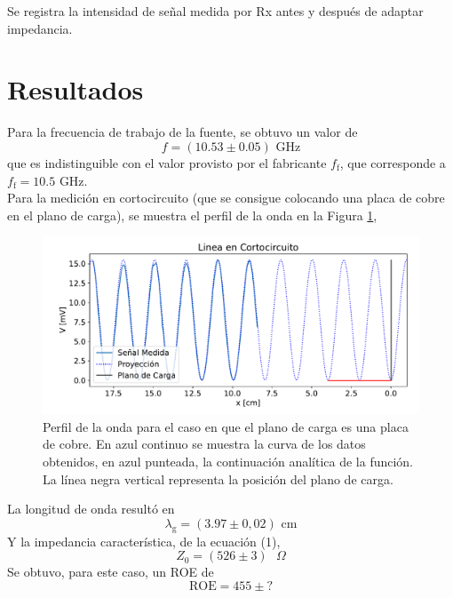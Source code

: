 \documentclass[11pt,a4paper]{article}
\begin{document}
\begin{multicols}{2}
Se registra la intensidad de señal medida por Rx antes y después de adaptar impedancia.

\section{Resultados}
Para la frecuencia de trabajo de la fuente, se obtuvo un valor de 
$$
f = (10.53 \pm 0.05) \text{ GHz}
$$
que es indistinguible con el valor provisto por el fabricante $f_\text{f}$, que corresponde a $f_\text{f}=10.5$ GHz. \\

Para la medición en cortocircuito (que se consigue colocando una placa de cobre en el plano de carga), se muestra el perfil de la onda en la Figura \ref{fig:cortocir}, 
\begin{figure}[H]
    \centering
    \includegraphics[width=\linewidth]{Images/lineacc.pdf}
    \caption{Perfil de la onda para el caso en que el plano de carga es una placa de cobre. En azul continuo se muestra la curva de los datos obtenidos, en azul punteada, la continuación analítica de la función. La línea negra vertical representa la posición del plano de carga.}
    \label{fig:cortocir}
\end{figure}

La longitud de onda resultó en
$$
\lambda_\text{g} = (3.97 \pm 0,02) \text{ cm} 
$$
Y la impedancia característica, de la ecuación (1),
$$
Z_0 = (526 \pm 3) \text{ } \Omega
$$
Se obtuvo, para este caso, un ROE de
$$
\text{ROE} = 455\pm?
$$


\end{multicols}
\end{document}
